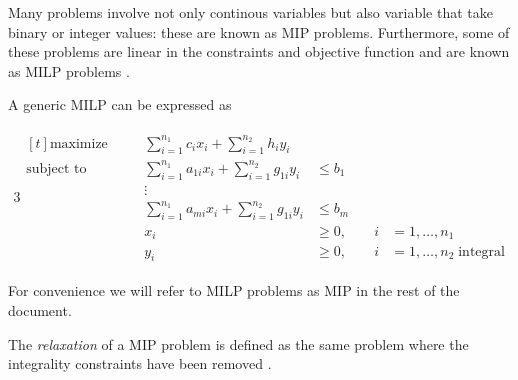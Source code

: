 Many problems involve not only continous variables but also variable that take binary or
integer values: these are known as \acrfull{MIP} problems. Furthermore, some of
these problems are linear in the constraints and objective function and are
known as \acrfull{MILP} problems
\cite{Edgar2001}\cite{Wolsey1998}.

A generic \acrshort{MILP} can be expressed as \cite{Conforti2016}

\begin{alignat}{3}
	\label{eq:standard-form-milp}
	\begin{aligned}[t]
		\text{maximize}   &                                     & \sum_{i=1}^{n_{1} } c_{i}x_{i} +
		\sum_{i=1}^{n_{2} } h_{i}y_{i}                                                                                                                               \\
		\text{subject to} & \quad                               & \sum_{i=1}^{n_{1} } a_{1i}  x_{i} + \sum_{i=1}^{n_{2} } g_{1i}  y_{i} & \leq b_{1}       &         \\
		                  &                                     & \vdots                                                                                             \\
		                  &                                     & \sum_{i=1}^{n_{1} } a_{mi}  x_{i} + \sum_{i=1}^{n_{2} } g_{1i}  y_{i} & \leq b_{m}       &         \\
		                  &                                     & x_{i}
		                  & \geq 0,                             & \quad i                                                               & =1 ,\dots, n_{1}           \\
		                  &                                     & y_{i}                                                                 & \geq 0,          & \quad i
		                  & =1 ,\dots, n_{2} \; \text{integral}
	\end{aligned}
\end{alignat}

For convenience we will refer to \acrshort{MILP} problems as \acrshort{MIP} in
the rest of the document.

The \emph{relaxation} of a \acrshort{MIP} problem is defined as the same
problem where the integrality constraints have been removed \cite{Edgar2001}.

